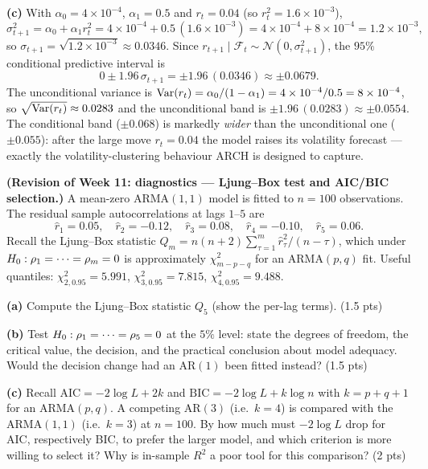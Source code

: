 \documentclass[11pt]{article}
\newcommand{\F}{\mathcal{F}}
\begin{document}
\textbf{(c)} With $\alpha_0=4\times10^{-4}$, $\alpha_1=0.5$ and $r_t=0.04$ (so $r_t^2=1.6\times10^{-3}$),
\[
\sigma_{t+1}^2=\alpha_0+\alpha_1 r_t^2
=4\times10^{-4}+0.5\,(1.6\times10^{-3})
=4\times10^{-4}+8\times10^{-4}=1.2\times10^{-3},
\]
so $\sigma_{t+1}=\sqrt{1.2\times10^{-3}}\approx0.0346$. Since $r_{t+1}\mid\F_t\sim\mathcal N(0,\sigma_{t+1}^2)$, the $95\%$ conditional predictive interval is
\[
0\pm1.96\,\sigma_{t+1}=\pm1.96\,(0.0346)\approx\pm0.0679 .
\]
The unconditional variance is $\operatorname{Var}(r_t)=\alpha_0/(1-\alpha_1)=4\times10^{-4}/0.5=8\times10^{-4}$, so $\sqrt{\operatorname{Var}(r_t)}\approx0.0283$ and the unconditional band is $\pm1.96\,(0.0283)\approx\pm0.0554$. The conditional band ($\pm0.068$) is markedly \emph{wider} than the unconditional one ($\pm0.055$): after the large move $r_t=0.04$ the model raises its volatility forecast --- exactly the volatility-clustering behaviour ARCH is designed to capture.

\statementstart
\textbf{(Revision of Week 11: diagnostics --- Ljung--Box test and AIC/BIC selection.)} A mean-zero $\mathrm{ARMA}(1,1)$ model is fitted to $n=100$ observations. The residual sample autocorrelations at lags $1$--$5$ are
\[
\hat r_1=0.05,\quad \hat r_2=-0.12,\quad \hat r_3=0.08,\quad \hat r_4=-0.10,\quad \hat r_5=0.06 .
\]
Recall the Ljung--Box statistic $Q_m=n(n+2)\sum_{\tau=1}^{m}\hat r_\tau^2/(n-\tau)$, which under $H_0:\rho_1=\cdots=\rho_m=0$ is approximately $\chi^2_{m-p-q}$ for an $\mathrm{ARMA}(p,q)$ fit. Useful quantiles: $\chi^2_{2,0.95}=5.991$, $\chi^2_{3,0.95}=7.815$, $\chi^2_{4,0.95}=9.488$.

\textbf{(a)} Compute the Ljung--Box statistic $Q_5$ (show the per-lag terms). \hfill(1.5 pts)

\textbf{(b)} Test $H_0:\rho_1=\cdots=\rho_5=0$ at the $5\%$ level: state the degrees of freedom, the critical value, the decision, and the practical conclusion about model adequacy. Would the decision change had an $\mathrm{AR}(1)$ been fitted instead? \hfill(1.5 pts)

\textbf{(c)} Recall $\mathrm{AIC}=-2\log L+2k$ and $\mathrm{BIC}=-2\log L+k\log n$ with $k=p+q+1$ for an $\mathrm{ARMA}(p,q)$. A competing $\mathrm{AR}(3)$ (i.e.\ $k=4$) is compared with the $\mathrm{ARMA}(1,1)$ (i.e.\ $k=3$) at $n=100$. By how much must $-2\log L$ drop for AIC, respectively BIC, to prefer the larger model, and which criterion is more willing to select it? Why is in-sample $R^2$ a poor tool for this comparison? \hfill(2 pts)
\statementend
\end{document}
